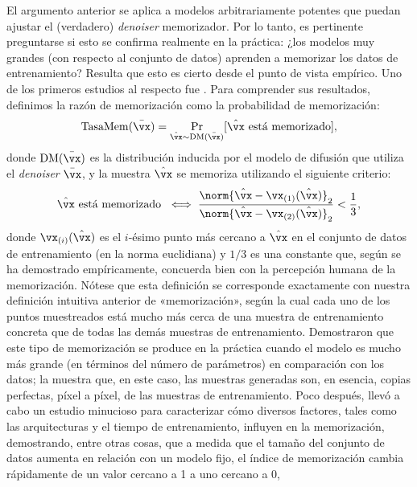 \documentclass[../../book-main.tex]{subfiles}
\begin{document}
El argumento anterior se aplica a modelos arbitrariamente potentes que puedan
ajustar el (verdadero) \textit{denoiser} memorizador. Por lo tanto, es pertinente preguntarse
si esto se confirma realmente en la práctica: ¿los modelos muy grandes
(con respecto al conjunto de datos) aprenden a memorizar los datos de entrenamiento? Resulta
que esto es cierto desde el punto de vista empírico. Uno de los primeros estudios al respecto
fue \cite{yoon2023diffusion}. Para comprender sus resultados, definimos la
razón de memorización como la probabilidad de memorización:
\begin{equation}
    \mathrm{TasaMem}(\bar{\vx}) = \Pr_{\hat{\vx} \sim
    \mathrm{DM}(\bar{\vx})}[\hat{\vx}\ \text{está memorizado}],
\end{equation}
donde \(\mathrm{DM}(\bar{\vx})\) es la distribución inducida por el
modelo de difusión que utiliza el \textit{denoiser} \(\bar{\vx}\), y la muestra
\(\hat{\vx}\) se memoriza utilizando el siguiente criterio:
\begin{equation}\label{eq:diffusion_euclidean_memorization_criterion}
    \hat{\vx}\ \text{está memorizado}\ \iff \frac{\norm{\hat{\vx} -
    \vx_{(1)}(\hat{\vx})}_{2}}{\norm{\hat{\vx} -
    \vx_{(2)}(\hat{\vx})}_{2}} < \frac{1}{3},
\end{equation}
donde \(\vx_{(i)}(\hat{\vx})\) es el \(i\)-ésimo punto más cercano a
\(\hat{\vx}\) en el conjunto de datos de entrenamiento (en la norma euclidiana) y
\(1/3\) es una constante que, según se ha demostrado empíricamente, concuerda bien con
la percepción humana de la memorización. Nótese que esta definición se corresponde exactamente
con nuestra definición intuitiva anterior de «memorización», según la cual
cada uno de los puntos muestreados está mucho más cerca de una muestra de entrenamiento concreta que de todas
las demás muestras de entrenamiento. Demostraron que este tipo de memorización
se produce en la práctica cuando el modelo es mucho más grande (en términos del
número de parámetros) en comparación con los datos; la  muestra que,
en este caso, las muestras generadas son, en esencia, copias
perfectas, píxel a píxel, de las muestras de entrenamiento. Poco después, \cite{gu2023memorization}
llevó a cabo un estudio minucioso para caracterizar cómo diversos factores, tales como
las arquitecturas y el tiempo de entrenamiento, influyen en la memorización, demostrando, entre
otras cosas, que a medida que el tamaño del conjunto de datos aumenta en relación con un modelo fijo,
el índice de memorización cambia rápidamente de un valor cercano a 1 a uno cercano a 0,
\end{document}
